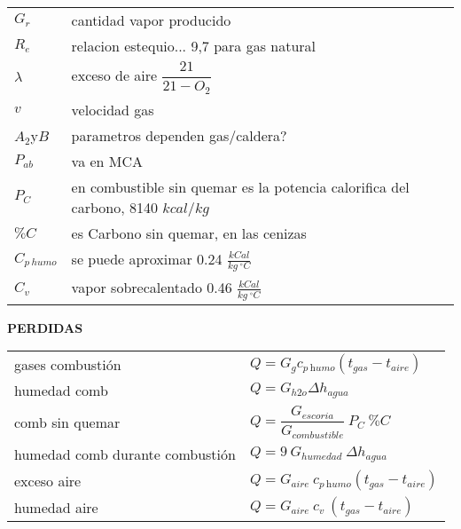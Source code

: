 \documentclass[11pt,a4paper]{article}
\begin{document}
	\begin{cajita}
		\renewcommand{\arraystretch}{1.25}
		\begin{multicols}{2}
			\begin{tabular}{@{}p{1.5cm}@{}@{}p{7cm}@{}}
				$G_{r}$ & cantidad vapor producido\\
	
				$R_{e}$&relacion estequio... 9,7 para gas natural\\
				$\lambda$&exceso de aire $\dfrac{21}{21-O_{2}}$\\
				$v$ & velocidad gas\\
				$A_{2}$y$B$& parametros dependen gas/caldera?\\
				$P_{ab}$ & va en MCA\\
				$P_C$& en combustible sin quemar es la potencia calorifica del carbono, 8140 $kcal/kg$\\
				$\% C$ & es Carbono sin quemar, en las cenizas\\
				$C_{p~humo}$ & se puede aproximar 0.24 $\frac{kCal}{kg~^{\circ} C}$\\
				$C_{v}$ & vapor sobrecalentado  0.46 $\frac{kCal}{kg~^{\circ} C}$
			\end{tabular}
		\vspace{0.4cm}
	
			\renewcommand{\arraystretch}{1.5}
	
			\textbf{PERDIDAS}\\
	
			\begin{tabular}{p{} l}
				gases combustión & $Q = G_{g} c_{p~\textit{humo}} (t_{gas}-t_{aire})$\\
				humedad comb & $ Q= G_{h2o} \Delta h_{agua}$\\
				comb sin quemar & $ Q =\dfrac{G_{escoria}}{G_{combustible}}~P_{C}~\% C$\\
				humedad comb \break durante combustión &$ Q=9~G_{humedad} ~\Delta h_{agua}$\\
				exceso aire & $Q = G_{aire}~c_{p~\textit{humo}} (t_{gas}-t_{aire})$\\
				humedad aire & $ Q = G_{aire}~ c_{v} ~ (t_{gas}-t_{aire})$\\
			\end{tabular}
			

\end{multicols}
\end{cajita}
\end{document}
